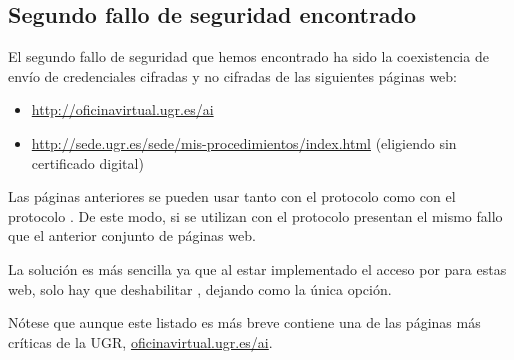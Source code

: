 \subsection*{Segundo fallo de seguridad encontrado}

El segundo fallo de seguridad que hemos encontrado ha sido la coexistencia de envío de credenciales cifradas y no cifradas de las siguientes páginas web:

\begin{itemize}
  \setlength\itemsep{0.1em}
  \item \url{http://oficinavirtual.ugr.es/ai}
  \item \url{http://sede.ugr.es/sede/mis-procedimientos/index.html} (eligiendo sin certificado digital)
\end{itemize}
Las páginas anteriores se pueden usar tanto con el protocolo   como con el protocolo  . De este modo, si se utilizan con el protocolo   presentan el mismo fallo que el anterior conjunto de páginas web.

La solución es más sencilla ya que al estar implementado el acceso por   para estas web, solo hay que deshabilitar , dejando    como la única opción.

Nótese que aunque este listado es más breve contiene una de las páginas más críticas de la UGR, \href{http://oficinavirtual.ugr.es/ai}{oficinavirtual.ugr.es/ai}.
